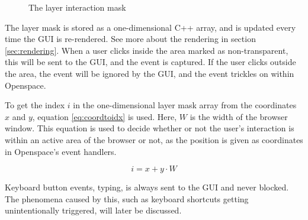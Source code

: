 \begin{figure}[!h]
  \centering
  \hfill
  \caption{The layer interaction mask}
\end{figure}

The layer mask is stored as a one-dimensional C++ array, and is updated every time the GUI is re-rendered. See more about the rendering in section \ref{sec:rendering}. When a user clicks inside the area marked as non-transparent, this will be sent to the GUI, and the event is captured. If the user clicks outside the area, the event will be ignored by the GUI, and the event trickles on within Openspace.

To get the index $i$ in the one-dimensional layer mask array from the coordinates $x$ and $y$, equation \ref{eq:coordtoidx} is used. Here, $W$ is the width of the browser window. This equation is used to decide whether or not the user's interaction is within an active area of the browser or not, as the position is given as coordinates in Openspace's event handlers.

\begin{equation}\label{eq:coordtoidx}
  i = x + y \cdot W
\end{equation}


Keyboard button events, typing, is always sent to the GUI and never blocked. The phenomena caused by this, such as keyboard shortcuts getting unintentionally triggered, will later be discussed. 

